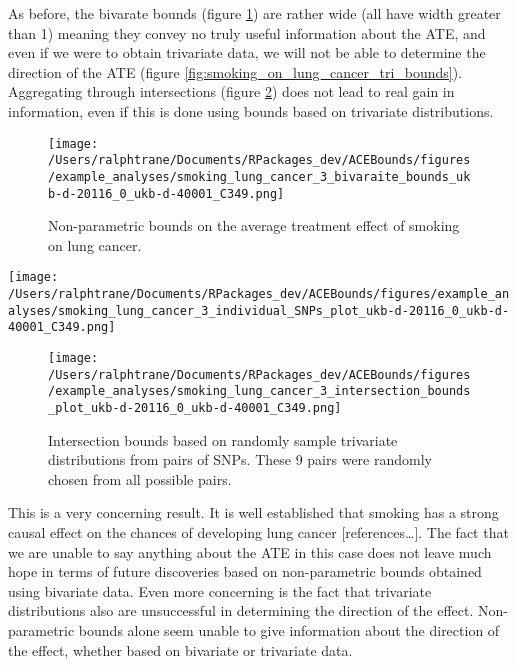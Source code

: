 \documentclass[
]{article}
\theoremstyle{plain}
\begin{document}
As before, the bivarate bounds (figure \ref{fig:smoking_on_lung_cancer_ind_bounds}) are rather wide (all have width greater than 1) meaning they convey no truly useful information about the ATE, and even if we were to obtain trivariate data, we will not be able to determine the direction of the ATE (figure \ref{fig:smoking_on_lung_cancer_tri_bounds}). Aggregating through intersections (figure \ref{fig:smoking_on_lung_cancer_intersections}) does not lead to real gain in information, even if this is done using bounds based on trivariate distributions.

\begin{figure}[H]
  \texttt{[image: /Users/ralphtrane/Documents/RPackages\_dev/ACEBounds/figures/example\_analyses/smoking\_lung\_cancer\_3\_bivaraite\_bounds\_ukb-d-20116\_0\_ukb-d-40001\_C349.png]}
  \caption{Non-parametric bounds on the average treatment effect of smoking on lung cancer.}
  \label{fig:smoking_on_lung_cancer_ind_bounds}
\end{figure}

\clearpage

\begin{sidewaysfigure}
  \texttt{[image: /Users/ralphtrane/Documents/RPackages\_dev/ACEBounds/figures/example\_analyses/smoking\_lung\_cancer\_3\_individual\_SNPs\_plot\_ukb-d-20116\_0\_ukb-d-40001\_C349.png]}
    \caption{500 bounds for each of the 84 SNPs. Each bound is based on a set of values for the trivariate distribution randomyl sampled. Bounds are color coded to show if they overlap 0 (grey) or do not (red). All bounds overlap 0.}
    \label{fig:smoking_on_lung_cancer_tri_bounds}
\end{sidewaysfigure}

\clearpage

\begin{figure}[H]
  \texttt{[image: /Users/ralphtrane/Documents/RPackages\_dev/ACEBounds/figures/example\_analyses/smoking\_lung\_cancer\_3\_intersection\_bounds\_plot\_ukb-d-20116\_0\_ukb-d-40001\_C349.png]}
  \caption{Intersection bounds based on randomly sample trivariate distributions from pairs of SNPs. These 9 pairs were randomly chosen from all possible pairs.}
  \label{fig:smoking_on_lung_cancer_intersections}
\end{figure}

This is a very concerning result. It is well established that smoking has a strong causal effect on the chances of developing lung cancer {[}references\ldots{]}. The fact that we are unable to say anything about the ATE in this case does not leave much hope in terms of future discoveries based on non-parametric bounds obtained using bivariate data. Even more concerning is the fact that trivariate distributions also are unsuccessful in determining the direction of the effect. Non-parametric bounds alone seem unable to give information about the direction of the effect, whether based on bivariate or trivariate data.
\end{document}
